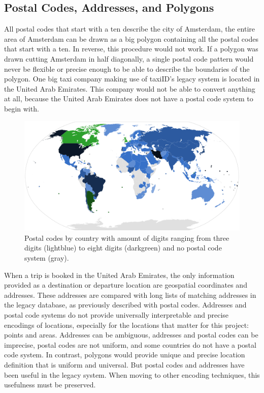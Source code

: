\subsection{Postal Codes, Addresses, and Polygons}
All postal codes that start with a ten describe the city of Amsterdam, the entire area of Amsterdam can be drawn as a big polygon containing all the postal codes that start with a ten. In reverse, this procedure would not work. If a polygon was drawn cutting Amsterdam in half diagonally, a single postal code pattern would never be flexible or precise enough to be able to describe the boundaries of the polygon. One big taxi company making use of taxiID's legacy system is located in the United Arab Emirates. This company would not be able to convert anything at all, because the United Arab Emirates does not have a postal code system to begin with.

\begin{figure}[htbp!]
	\centering
	\includegraphics[width=1\textwidth]{PostalCodes}
	\caption[PostalCodes]{Postal codes by country with amount of digits ranging from three digits (lightblue) to eight digits (darkgreen) and no postal code system (gray).}
	\label{fig:postalcodes}
\end{figure}

When a trip is booked in the United Arab Emirates, the only information provided as a destination or departure location are geospatial coordinates and addresses. These addresses are compared with long lists of matching addresses in the legacy database, as previously described with postal codes. Addresses and postal code systems do not provide universally interpretable and precise encodings of locations, especially for the locations that matter for this project: points and areas. Addresses can be ambiguous, addresses and postal codes can be imprecise, postal codes are not uniform, and some countries do not have a postal code system. In contrast, polygons would provide unique and precise location definition that is uniform and universal. But postal codes and addresses have been useful in the legacy system. When moving to other encoding techniques, this usefulness must be preserved.

